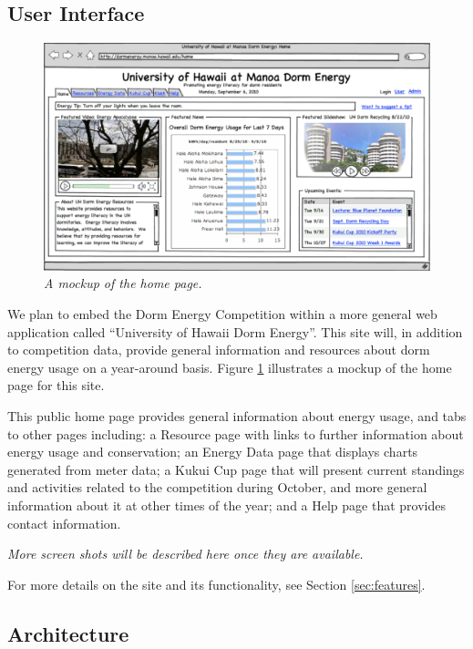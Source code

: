\documentclass[11pt]{article}
\begin{document}
\subsection{User Interface}
\label{sec:userinterface}

\begin{figure}[!ht]
  \center
  \includegraphics[width=1.0\textwidth]{home.tiff.eps}
  \caption{\em \small A mockup of the home page.}
 \label{fig:homepage}
\end{figure} 

We plan to embed the Dorm Energy Competition within a more general web
application called ``University of Hawaii Dorm Energy''.  This site will,
in addition to competition data, provide general information and resources
about dorm energy usage on a year-around basis.   Figure \ref{fig:homepage}
illustrates a mockup of the home page for this site. 


This public home page provides general information about energy usage, and
tabs to other pages including: a Resource page with links to further
information about energy usage and conservation; an Energy Data page that
displays charts generated from meter data; a Kukui Cup page that will
present current standings and activities related to the competition during
October, and more general information about it at other times of the year;
and a Help page that provides contact information.

{\em More screen shots will be described here once they are available.}

For more details on the site and its functionality, see Section \ref{sec:features}.

\subsection{Architecture}
\end{document}
